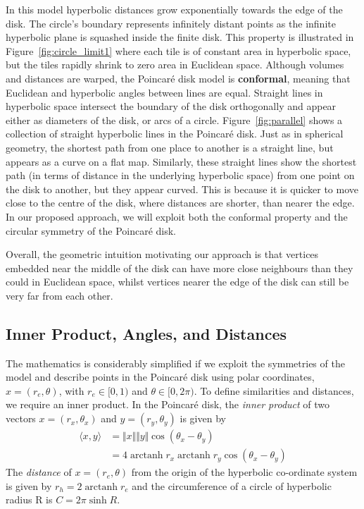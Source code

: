 \documentclass[sigconf, review]{acmart}
\DeclareMathOperator\arctanh{arctanh}
\begin{document}
In this model hyperbolic distances grow exponentially towards the edge of the disk. The circle's boundary represents infinitely distant points as the infinite hyperbolic plane is squashed inside the finite disk. This property is illustrated in Figure~\ref{fig:circle_limit1} where each tile is of constant area in hyperbolic space, but the tiles rapidly shrink to zero area in Euclidean space.
Although volumes and distances are warped, the Poincar\'e disk model is \textbf{conformal}, meaning that Euclidean and hyperbolic angles between lines are equal. 
Straight lines in hyperbolic space intersect the boundary of the disk orthogonally and appear either as diameters of the disk, or arcs of a circle. Figure~\ref{fig:parallel} shows a collection of straight hyperbolic lines in the Poincar\'e disk. Just as in spherical geometry, the shortest path from one place to another is a straight line, but appears as a curve on a flat map. Similarly, these straight lines show the shortest path (in terms of distance in the underlying hyperbolic space) from one point on the disk to another, but they appear curved. This is because it is quicker to move close to the centre of the disk, where distances are shorter, than nearer the edge.
In our proposed approach, we will exploit both the conformal property and the circular symmetry of the Poincar\'e disk.

Overall, the geometric intuition motivating our approach is that vertices embedded near the middle of the disk can have more close neighbours than they could in Euclidean space, whilst vertices nearer the edge of the disk can still be very far from each other.


\subsection{Inner Product, Angles, and Distances}
The mathematics is considerably simplified if we exploit the symmetries of the model and describe points in the Poincar\'e disk using polar coordinates, $x = (r_e,\theta)$, with $r_e \in [0, 1)$ and $\theta \in [0, 2\pi)$.
To define similarities and distances, we require an inner product. In the Poincar\'e disk, the \emph{inner product} of two vectors $x = (r_x, \theta_x)$ and $y=(r_y, \theta_y)$ is given by
\begin{align}
\langle x,y \rangle &= \Vert x \Vert \Vert y \Vert \cos (\theta_x - \theta_y) \\
&= 4 \arctanh r_x \arctanh r_y \cos(\theta_x - \theta_y) 
\label{eq:poincare_inner}
\end{align}
The \emph{distance} of $x = (r_e,\theta)$ from the origin of the hyperbolic co-ordinate system is given by $r_h = 2 \arctanh r_e$ and the circumference of a circle of hyperbolic radius R is $C = 2 \pi \sinh R$.
\end{document}
